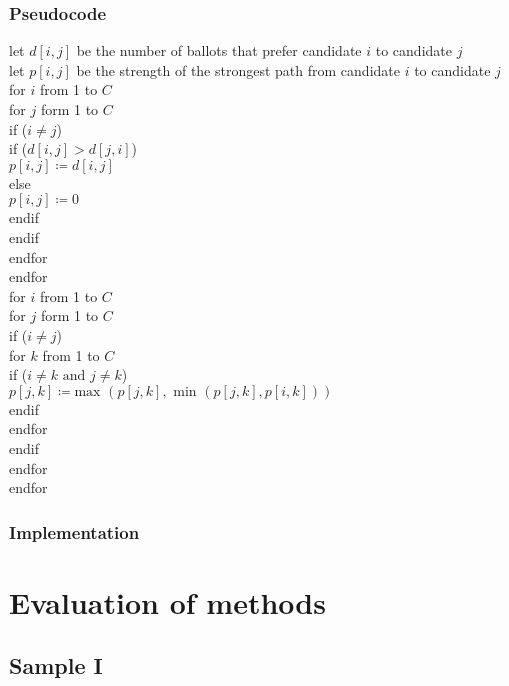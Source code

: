 \subsubsection{Pseudocode}
\label{Schulze psuedocode}
let $d[i,j]$ be the number of ballots that prefer candidate $i$ to candidate $j$\\
let $p[i,j]$ be the strength of the strongest path from candidate $i$ to candidate $j$\\
for $i$ from 1 to $C$\\
\tab for $j$ form 1 to $C$\\
\tab\tab if ($i \ne j$)\\
\tab\tab\tab if ($d[i,j] > d[j,i]$)\\
\tab\tab\tab\tab $p[i,j] \coloneqq d[i,j]$\\
\tab\tab\tab else\\
\tab\tab\tab\tab $p[i,j] \coloneqq 0$\\
\tab\tab\tab endif \\
\tab\tab endif \\
\tab endfor \\
endfor\\
for $i$ from 1 to $C$\\
\tab for $j$ form 1 to $C$\\
\tab\tab if ($i \ne j$)\\
\tab\tab\tab for $k$ from 1 to $C$\\
\tab\tab\tab\tab if ($i \ne k \text{ and } j \ne k$)\\
\tab\tab\tab\tab\tab $p[j,k] \coloneqq \text{max }(p[j,k], \text{ min }(p[j,k], p[i,k]))$\\
\tab\tab\tab\tab endif \\
\tab\tab\tab endfor \\
\tab\tab endif \\
\tab endfor \\
endfor\\

\subsubsection{Implementation}

\section{Evaluation of methods}
\subsection{Sample I}
